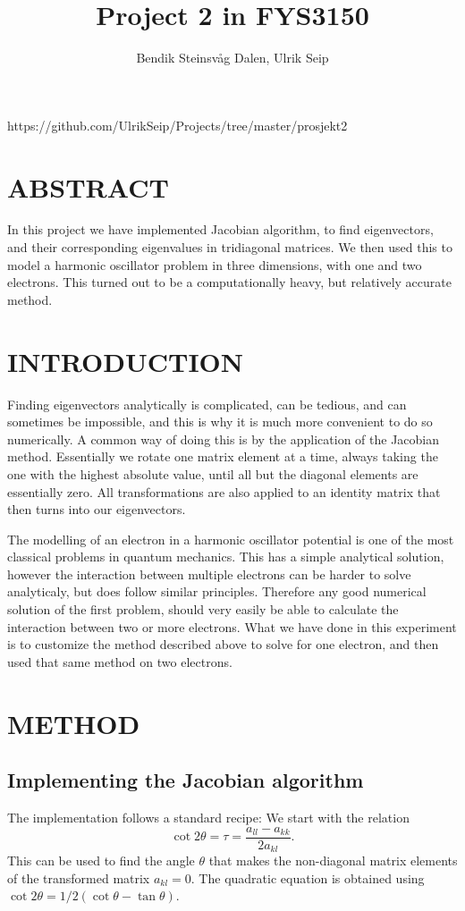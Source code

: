 \documentclass[a4paper]{article}
\title{Project 2 in FYS3150}
\author{Bendik Steinsvåg Dalen, Ulrik Seip}
\begin{document}
\maketitle

https://github.com/UlrikSeip/Projects/tree/master/prosjekt2

\section{ABSTRACT}

In this project we have implemented Jacobian algorithm, to find eigenvectors, and their corresponding eigenvalues in tridiagonal matrices. We then used this to model a harmonic oscillator problem in three dimensions, with one and two electrons. This turned out to be a computationally heavy, but relatively accurate method.

\section{INTRODUCTION}

Finding eigenvectors analytically is complicated, can be tedious, and can sometimes be impossible, and this is why it is much more convenient to do so numerically. A common way of doing this is by the application of the Jacobian method. Essentially we rotate one matrix element at a time, always taking the one with the highest absolute value, until all but the diagonal elements are essentially zero. All transformations are also applied to an identity matrix that then turns into our eigenvectors. 

The modelling of an electron in a harmonic oscillator potential is one of the most classical problems in quantum mechanics. This has a simple analytical solution, however the interaction between multiple electrons can be harder to solve analyticaly, but does follow similar principles. Therefore any good numerical solution of the first problem, should very easily be able to calculate the interaction between two or more electrons. What we have done in this experiment is to customize the method described above to solve for one electron, and then used that same method on two electrons. 

\section{METHOD}

\subsection{Implementing the Jacobian algorithm}
The implementation follows a standard recipe:\cite{lecture notes}
We start with the relation
\begin{equation*}\cot 2\theta=\tau = \frac{a_{ll}-a_{kk}}{2a_{kl}}.
\end{equation*}
This can be used to find the angle $\theta$ that makes the  non-diagonal matrix elements of the transformed matrix 
$a_{kl} = 0$. The quadratic equation is obtained using $\cot 2\theta=1/2(\cot\theta-\tan\theta)$.
\end{document}

